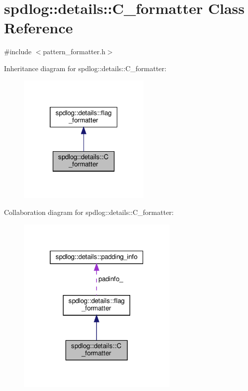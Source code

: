 \hypertarget{classspdlog_1_1details_1_1_c__formatter}{}\section{spdlog\+:\+:details\+:\+:C\+\_\+formatter Class Reference}
\label{classspdlog_1_1details_1_1_c__formatter}


{\ttfamily \#include $<$pattern\+\_\+formatter.\+h$>$}



Inheritance diagram for spdlog\+:\+:details\+:\+:C\+\_\+formatter\+:
\nopagebreak
\begin{figure}[H]
\begin{center}
\leavevmode
\includegraphics[width=181pt]{classspdlog_1_1details_1_1_c__formatter__inherit__graph}
\end{center}
\end{figure}


Collaboration diagram for spdlog\+:\+:details\+:\+:C\+\_\+formatter\+:
\nopagebreak
\begin{figure}[H]
\begin{center}
\leavevmode
\includegraphics[width=220pt]{classspdlog_1_1details_1_1_c__formatter__coll__graph}
\end{center}
\end{figure}
